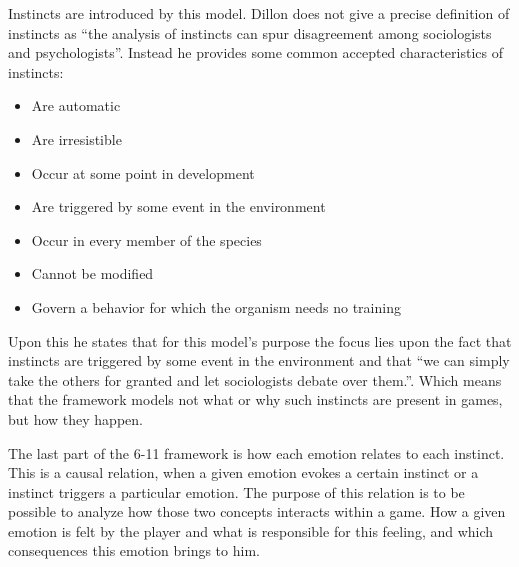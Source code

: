 Instincts are introduced by this model. Dillon does not give a precise definition of instincts as ``the analysis of instincts can spur disagreement among sociologists and psychologists''\citep{dillon_way_2010}. Instead he provides some common accepted characteristics of instincts:
\begin{itemize}
    \item Are automatic
    \item Are irresistible
    \item Occur at some point in development
    \item Are triggered by some event in the environment
    \item Occur in every member of the species
    \item Cannot be modified
    \item Govern a behavior for which the organism needs no 
training
\end{itemize}

Upon this he states that for this model's purpose the focus lies upon the fact that instincts are triggered by some event in the environment and that ``we can simply take the others for granted and let sociologists debate over them.''\citep{dillon_way_2010}. Which means that the framework models not what or why such instincts are present in games, but how they happen.

The last part of the 6-11 framework is how each emotion relates to each instinct. This is a causal relation, when a given emotion evokes a certain instinct or a instinct triggers a particular emotion. The purpose of this relation is to be possible to analyze how those two concepts interacts within a game. How a given emotion is felt by the player and what is responsible for this feeling, and which consequences this emotion brings to him. 
